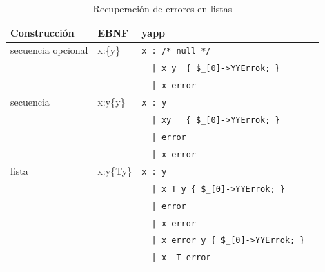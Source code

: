 \vspace{0.5cm}
\begin{table}
\begin{center}
\begin{tabular}{|l|l|l|}
\hline
Construcción       & EBNF & yapp\\
\hline
secuencia opcional & x:\{y\}   & \verb#x : /* null */             #\\ 
                   &           & \verb#  | x y  { $_[0]->YYErrok; }      #\\
                   &           & \verb#  | x error                #\\
\hline
secuencia          & x:y\{y\}  & \verb#x : y                      #\\ 
                  &           & \verb#  | xy   { $_[0]->YYErrok; }      #\\
                &           & \verb#  | error                  #\\
                &           & \verb#  | x error                #\\
\hline
lista              & x:y\{Ty\} & \verb#x : y                       #\\ 
                  &           & \verb#  | x T y { $_[0]->YYErrok; }      #\\
                &           & \verb#  | error                   #\\
                &           & \verb#  | x error                 #\\
                &           & \verb#  | x error y { $_[0]->YYErrok; }  #\\
                &           & \verb#  | x  T error              #\\
\hline
\end{tabular}
\end{center}
\caption{Recuperación de errores en listas}
\label{table:err}
\end{table}
\vspace{0.25cm}

